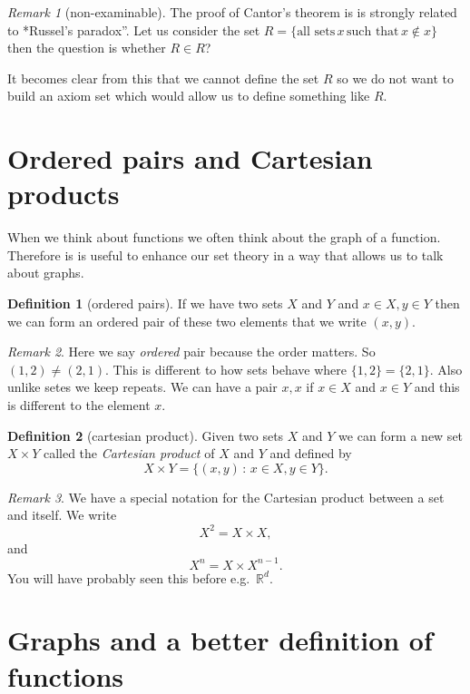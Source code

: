 \documentclass[
]{book}
\theoremstyle{definition}
\newtheorem{definition}{Definition}[chapter]
\theoremstyle{definition}
\theoremstyle{definition}
\theoremstyle{definition}
\theoremstyle{remark}
\newtheorem*{remark}{Remark}
\begin{document}
\begin{remark}[non-examinable]
The proof of Cantor's theorem is is strongly related to *Russel's paradox''. Let us consider the set \(R= \{ \mbox{all sets}\, x \,\mbox{such that} \, x \notin x \}\) then the question is whether \(R \in R\)?

It becomes clear from this that we cannot define the set \(R\) so we do not want to build an axiom set which would allow us to define something like \(R\).
\end{remark}

\section{Ordered pairs and Cartesian products}\label{ordered-pairs-and-cartesian-products}

When we think about functions we often think about the graph of a function. Therefore is is useful to enhance our set theory in a way that allows us to talk about graphs.

\begin{definition}[ordered pairs]
If we have two sets \(X\) and \(Y\) and \(x \in X, y \in Y\) then we can form an ordered pair of these two elements that we write \((x,y)\).
\end{definition}

\begin{remark}
Here we say \emph{ordered} pair because the order matters. So \((1,2) \neq (2,1)\). This is different to how sets behave where \(\{1,2\} = \{2,1\}\). Also unlike setes we keep repeats. We can have a pair \(x,x\) if \(x \in X\) and \(x \in Y\) and this is different to the element \(x\).
\end{remark}

\begin{definition}[cartesian product]
Given two sets \(X\) and \(Y\) we can form a new set \(X \times Y\) called the \emph{Cartesian product} of \(X\) and \(Y\) and defined by
\[ X \times Y = \{ (x,y) \,:\, x \in X, y \in Y\}.  \]
\end{definition}

\begin{remark}
We have a special notation for the Cartesian product between a set and itself. We write
\[ X^2 = X \times X,  \] and
\[ X^n = X \times X^{n-1}.  \] You will have probably seen this before e.g.~\(\mathbb{R}^d\).
\end{remark}

\section{Graphs and a better definition of functions}\label{graphs-and-a-better-definition-of-functions}
\end{document}
